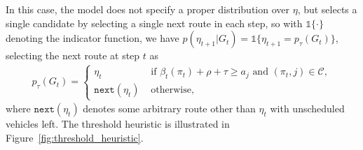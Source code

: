 \documentclass[a4paper]{report}
\theoremstyle{definition}
\theoremstyle{plain}
\begin{document}
In this case, the model does not specify a proper distribution over $\eta$, but
selects a single candidate by selecting a single next route in each step, so
with $\mathds{1}\{ \cdot \}$ denoting the indicator function, we have
$p(\eta_{t+1} | G_{t}) = \mathds{1}\{ \eta_{t+1} = p_{\tau}(G_{t}) \}$, selecting the next
route at step $t$ as
\begin{align*}
  p_{\tau}(G_{t}) = \begin{cases}
                \eta_{t} \quad &\text{ if } \beta_{t}(\pi_{t}) + \rho + \tau \geq a_{j} \text{ and } (\pi_{t},j) \in \mathcal{C} , \\
                \texttt{next}(\eta_{t}) & \text{ otherwise, }
              \end{cases}
\end{align*}
where $\texttt{next}(\eta_{t})$ denotes some arbitrary route other than $\eta_{t}$ with
unscheduled vehicles left.
%
The threshold heuristic is illustrated in Figure~\ref{fig:threshold_heuristic}.
\end{document}
